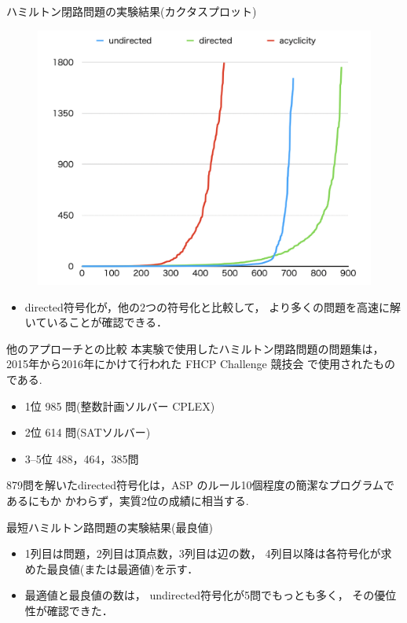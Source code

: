 \documentclass[dvipdfmx,10pt]{beamer}
\begin{document}
\begin{frame}{ハミルトン閉路問題の実験結果(カクタスプロット)}
\begin{figure}[tb]
\begin{center}
  \includegraphics[width=0.7\linewidth]{fig/cactus.png}
\label{cactus}
\end{center}
\end{figure}
\begin{itemize}
\item \textsf{directed}符号化が，他の2つの符号化と比較して，
      より多くの問題を高速に解いていることが確認できる．
\end{itemize}
\end{frame}
\begin{frame}{他のアプローチとの比較}
本実験で使用したハミルトン閉路問題の問題集は，
2015年から2016年にかけて行われた FHCP Challenge 競技会
で使用されたものである.
\begin{itemize}
\item 1位 985 問(整数計画ソルバー CPLEX)
\item 2位 614 問(SATソルバー)
\item 3--5位 488，464，385問
\end{itemize}
\begin{alertblock}{}
879問を解いた\textsf{directed}符号化は，ASP 
のルール10個程度の簡潔なプログラムであるにもか
かわらず，実質2位の成績に相当する.
\end{alertblock}
\end{frame}
\begin{frame}{最短ハミルトン路問題の実験結果(最良値)}
\begin{itemize}
\item 1列目は問題，2列目は頂点数，3列目は辺の数，
      4列目以降は各符号化が求めた最良値(または最適値)を示す．
\item 最適値と最良値の数は，
      \textsf{undirected}符号化が5問でもっとも多く，
      その優位性が確認できた．
\end{itemize}
\end{frame}
\end{document}

